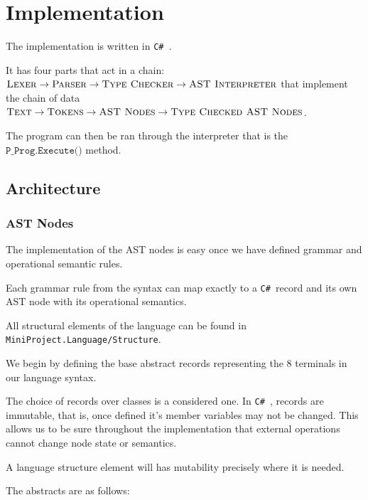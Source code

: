 \documentclass[11pt,a4paper]{article}
\newcommand {\csharp}{\texttt{C\#\ }}
\begin{document}
\section{Implementation}

The implementation is written in \csharp.

It has four parts that act in a chain: $\textsc{Lexer} \to \textsc{Parser} \to \textsc{Type Checker} \to \textsc{AST Interpreter}$ that implement the chain of data $\textsc{Text} \to \textsc{Tokens} \to \textsc{AST Nodes} \to \textsc{Type Checked AST Nodes}$.

The program can then be ran through the interpreter that is the $\texttt{P\_Prog.Execute()}$ method.

\subsection{Architecture}
\subsubsection{AST Nodes}
The implementation of the AST nodes is easy once we have defined grammar and operational semantic rules. 

Each grammar rule from the syntax can map exactly to a \csharp record and its own AST node with its operational semantics.

All structural elements of the language can be found in \texttt{MiniProject.Language/Structure}.

We begin by defining the base abstract records representing the 8 terminals in our language syntax. 

The choice of records over classes is a considered one. In \csharp, records are immutable, that is, once defined it's member variables may not be changed. This allows us to be sure throughout the implementation that external operations cannot change node state or semantics.

A language structure element will has mutability precisely where it is needed.

The abstracts are as follows:
\end{document}
